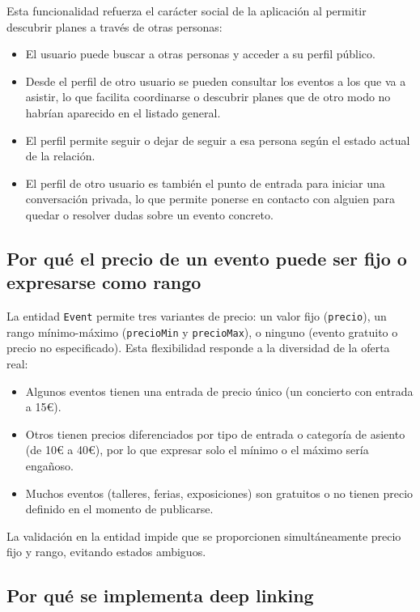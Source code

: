 Esta funcionalidad refuerza el carácter social de la aplicación al permitir descubrir planes a través de otras personas:

\begin{itemize}
    \item El usuario puede buscar a otras personas y acceder a su perfil público.
    \item Desde el perfil de otro usuario se pueden consultar los eventos a los que va a asistir, lo que facilita coordinarse o descubrir planes que de otro modo no habrían aparecido en el listado general.
    \item El perfil permite seguir o dejar de seguir a esa persona según el estado actual de la relación.
    \item El perfil de otro usuario es también el punto de entrada para iniciar una conversación privada, lo que permite ponerse en contacto con alguien para quedar o resolver dudas sobre un evento concreto.
\end{itemize}

\subsection{Por qué el precio de un evento puede ser fijo o expresarse como rango}

La entidad \texttt{Event} permite tres variantes de precio: un valor fijo (\texttt{precio}), un rango mínimo-máximo (\texttt{precioMin} y \texttt{precioMax}), o ninguno (evento gratuito o precio no especificado). Esta flexibilidad responde a la diversidad de la oferta real:

\begin{itemize}
    \item Algunos eventos tienen una entrada de precio único (un concierto con entrada a 15€).
    \item Otros tienen precios diferenciados por tipo de entrada o categoría de asiento (de 10€ a 40€), por lo que expresar solo el mínimo o el máximo sería engañoso.
    \item Muchos eventos (talleres, ferias, exposiciones) son gratuitos o no tienen precio definido en el momento de publicarse.
\end{itemize}

La validación en la entidad impide que se proporcionen simultáneamente precio fijo y rango, evitando estados ambiguos.

\subsection{Por qué se implementa deep linking}

